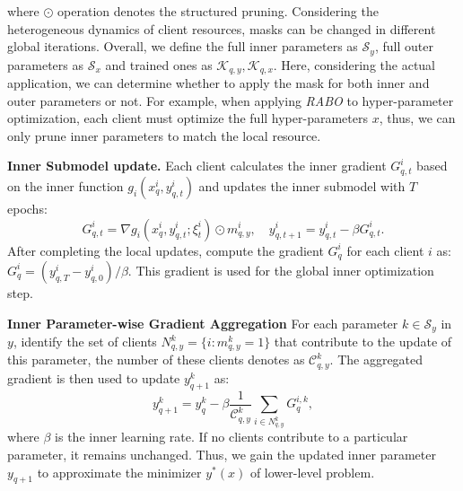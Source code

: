\documentclass[lettersize,journal]{IEEEtran}
\begin{document}
where $\odot$ operation denotes the structured pruning. Considering the heterogeneous dynamics of client resources, masks can be changed in different global iterations. Overall, we define the full inner parameters as $\mathcal{S}_{y}$, full outer parameters as $\mathcal{S}_{x}$ and trained ones as $\mathcal{K}_{q,y}, \mathcal{K}_{q,x}$.
Here, considering the actual application, we can determine whether to apply the mask for both inner and outer parameters or not. For example, when applying \textit{RABO} to hyper-parameter optimization, each client must optimize the full hyper-parameters $x$, thus, we can only prune inner parameters to match the local resource.

\textbf{Inner Submodel update.}
Each client calculates the inner gradient  $G_{q,t}^i$ based on the inner function $g_i(x^i_{q}, y^i_{q,t})$ and updates the inner submodel with $T$ epochs: 
\begin{equation}
    G_{q,t}^i = \nabla g_i(x^i_{q}, y^i_{q,t}; \xi_t^i) \odot m^i_{q,y},\quad y^i_{q,t+1} = y^i_{q,t} - \beta G_{q,t}^i   .
\end{equation}
After completing the local updates, compute the gradient \( G_q^i \) for each client \( i \) as:
$G_q^i = (y^i_{q,T} - y^i_{q,0})/\beta$.
This gradient is used for the global inner optimization step.

\textbf{Inner Parameter-wise Gradient Aggregation}
For each parameter $k \in \mathcal{S}_y$ in $y$, identify the set of clients $N_{q,y}^k=\{ i:m_{q,y}^k=1\}$ that contribute to the update of this parameter, the number of these clients denotes as $\mathcal{C}_{q,y}^k$. The aggregated gradient is then used to update $y_{q+1}^k$ as:
\begin{equation}
y_{q+1}^k = y_q^k - \beta \frac{1}{\mathcal{C}_{q,y}^k} \sum_{i \in N_{q,y}^k} G_q^{i,k},
\end{equation}
where $\beta$ is the inner learning rate. If no clients contribute to a particular parameter, it remains unchanged. Thus, we gain the updated inner parameter $y_{q+1}$ to approximate the minimizer $y^*(x)$ of lower-level problem.
\end{document}
